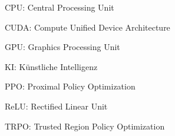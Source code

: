 CPU: Central Processing Unit

CUDA: Compute Unified Device Architecture

GPU: Graphics Processing Unit

KI: Künstliche Intelligenz

PPO: Proximal Policy Optimization

ReLU: Rectified Linear Unit

TRPO: Trusted Region Policy Optimization
